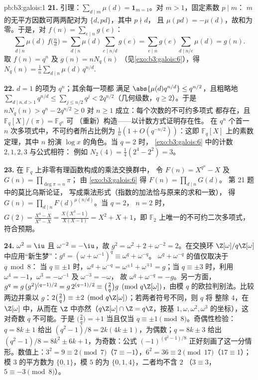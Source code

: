 \begin{solution}{pb:b3:galois:1}
\textbf{21.} 引理：$\sum_{d \mid m}\mu(d) = \mathbf
1_{m=1}$。对 $m > 1$，固定素数 $p \mid m$：
$m$ 的无平方因数可两两配对为 $\{d, pd\}$，其中 $p \nmid d$，
且 $\mu(pd) = -\mu(d)$，故和为零。于是，对 $f(n) =
\sum_{e\mid n}g(e)$：
\[
\sum_{d \mid n}\mu(d)\,f\bigl(\tfrac nd\bigr)
= \sum_{d \mid n}\mu(d)\!\!\sum_{e \mid n/d}\!\!g(e)
= \sum_{e \mid n}g(e)\!\!\sum_{d \mid n/e}\!\!\mu(d)
= g(n) .
\]
取 $f(n) = q^n$ 及 $g(n) = nN_q(n)$
（见\cref{exo:b3:galois:6}），得 $N_q(n) =
\frac1n\sum_{d\mid n}\mu(d)\,q^{n/d}$.

\textbf{22.} $d = 1$ 的项为 $q^n$；其余每一项都
满足 $\abs{\mu(d)q^{n/d}} \leq q^{n/2}$，且粗略地
$\sum_{d \mid n, d > 1}q^{n/d} \leq \sum_{j \leq
n/2}q^j < 2q^{n/2}$（几何级数，$q \geq 2$）。于是 $nN_q(n) >
q^n - 2q^{n/2} \geq 0$ 对 $n \geq 1$ 成立：每个次数的不可约多项式
都存在，且 $\mathbb F_q[X]/(\pi) = \mathbb F_{q^n}$ 可
（重新）构造——以计数方式证明存在性。
在 $q^n$ 个首一 $n$ 次多项式中，不可约者所占比例为
$\frac1n(1 + O(q^{-n/2}))$：这即
$\mathbb F_q[X]$ 上的素数定理，其中 $n$ 扮演 $\log x$ 的角色。当 $q = 2$ 时，
\cref{exo:b3:galois:6} 中的计数 $2, 1, 2, 3$ 与公式相符：
例如 $N_2(4) = \frac14(2^4 - 2^2) = 3$。

\textbf{23.} 在 $\mathbb F_q$ 上非零有理函数构成的乘法交换群中，
令 $F(n) = X^{q^n} -
X$ 及 $G(n) = \prod_{\deg\pi = n}\pi$；
由 \cref{exo:b3:galois:6} 得 $F(n) = \prod_{d\mid n}G(d)$。
第 21 题中的莫比乌斯论证，
写成乘法形式（指数的加法恰与原来的求和一致），
得 $G(n) = \prod_{d \mid n}F(d)^{\mu(n/d)}$。当 $q = 2$，
$n = 2$ 时，$G(2) = \frac{X^4 - X}{X^2 - X} = \frac{X(X^3 -
1)}{X(X - 1)} = X^2 + X + 1$，即
$\mathbb F_2$ 上唯一的不可约二次多项式，符合预期。

\textbf{24.} $\omega^2 = \iu$ 且 $\omega^{-2} = -\iu$，故
$g^2 = \omega^2 + 2 + \omega^{-2} = 2$。在交换环
$\Z[\omega]/q\Z[\omega]$ 中应用“新生梦”：$g^q =
(\omega + \omega^{-1})^q \equiv \omega^q + \omega^{-q}$。
$\omega^q + \omega^{-q}$ 的值仅取决于 $q \bmod 8$：
当 $q \equiv \pm1$ 时，$\omega^q + \omega^{-q} = \omega^{\pm1} +
\omega^{\mp1} = g$；当 $q \equiv \pm3$ 时，利用 $\omega^4 =
-1$，$\omega^{3} = -\omega^{-1}$ 及 $\omega^{-3} = -\omega$，
故 $\omega^q + \omega^{-q} = -g$。另一方面，$g^q =
g\,(g^2)^{(q-1)/2} = g\,2^{(q-1)/2} \equiv \bigl(\frac2q\bigr)
g \pmod{q\Z[\omega]}$，由模 $q$ 的欧拉判别法。比较
两边并乘以 $g$：$2\bigl(\frac2q\bigr) \equiv
\pm2 \pmod{q\Z[\omega]}$；若两者符号不同，则 $q$ 将
整除 $4$，在 $\Z[\omega]$ 中，从而在 $\Z$ 中亦然（$q\Z[\omega] \cap
\Z = q\Z$，按基 $1, \omega, \omega^2,
\omega^3$ 的坐标），这对奇数 $q$ 不可能。于是 $\bigl(\frac2q\bigr) =
+1$ 当且仅当 $q \equiv \pm1 \pmod 8$。奇偶性检验：$q = 8k \pm 1$
给出 $(q^2 - 1)/8 = 2k(4k \pm 1)$，为偶数；$q = 8k \pm 3$
给出 $(q^2 - 1)/8 = 8k^2 \pm 6k + 1$，为奇数：公式
$(-1)^{(q^2-1)/8}$ 正好刻画了这一分情形。数值上：$3^2
= 9 \equiv 2 \pmod 7$（$7 \equiv -1$），$6^2 = 36 \equiv 2
\pmod{17}$（$17 \equiv 1$）；模 $3$ 的平方数为 $\{0,
1\}$，模 $5$ 的为 $\{0, 1, 4\}$，二者均不含 $2$
（$3 \equiv 3$，$5 \equiv -3 \pmod 8$）。


\end{solution}
